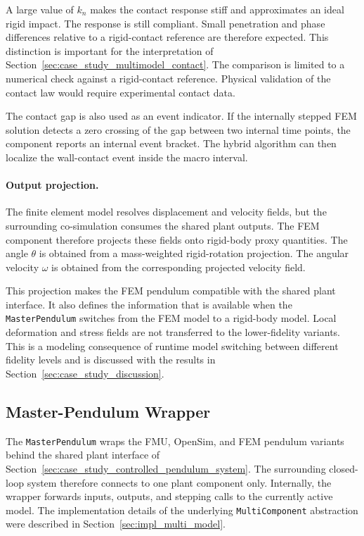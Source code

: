 A large value of \(k_n\) makes the contact response stiff and approximates an ideal rigid impact.
The response is still compliant.
Small penetration and phase differences relative to a rigid-contact reference are therefore expected.
This distinction is important for the interpretation of Section~\ref{sec:case_study_multimodel_contact}.
The comparison is limited to a numerical check against a rigid-contact reference.
Physical validation of the contact law would require experimental contact data.

The contact gap is also used as an event indicator.
If the internally stepped \ac{FEM} solution detects a zero crossing of the gap between two internal time points, the component reports an internal event bracket.
The hybrid algorithm can then localize the wall-contact event inside the macro interval.

\paragraph{Output projection.}
The finite element model resolves displacement and velocity fields, but the surrounding co-simulation consumes the shared plant outputs.
The \ac{FEM} component therefore projects these fields onto rigid-body proxy quantities.
The angle \(\theta\) is obtained from a mass-weighted rigid-rotation projection.
The angular velocity \(\omega\) is obtained from the corresponding projected velocity field.

This projection makes the \ac{FEM} pendulum compatible with the shared plant interface.
It also defines the information that is available when the \texttt{MasterPendulum} switches from the \ac{FEM} model to a rigid-body model.
Local deformation and stress fields are not transferred to the lower-fidelity variants.
This is a modeling consequence of runtime model switching between different fidelity levels and is discussed with the results in Section~\ref{sec:case_study_discussion}.

\subsection{Master-Pendulum Wrapper}
\label{sec:case_study_master_pendulum}

The \texttt{MasterPendulum} wraps the \ac{FMU}, OpenSim, and \ac{FEM} pendulum variants behind the shared plant interface of Section~\ref{sec:case_study_controlled_pendulum_system}.
The surrounding closed-loop system therefore connects to one plant component only.
Internally, the wrapper forwards inputs, outputs, and stepping calls to the currently active model.
The implementation details of the underlying \texttt{MultiComponent} abstraction were described in Section~\ref{sec:impl_multi_model}.

